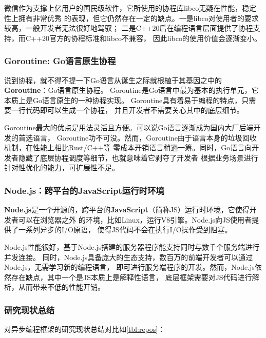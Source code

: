 \documentclass[supercite]{HustGraduPaper}
\newcommand{\rtbl}[1]{\autoref{tbl:#1}}
\theoremstyle{definition}
\begin{document}
微信\cite{montag2018multipurpose}作为支撑上亿用户的国民级软件，它所使用的协程库libco无疑在性能，稳定性上拥有非常优秀
的表现，但它仍然存在一定的缺点。一是libco对使用者的要求较高，一般开发者无法很好地驾驭；
二是C++20后在编程语言层面提供了协程支持\cite{belson2020c++}，而C++20官方的协程标准和libco不兼容，
因此libco的使用价值会逐渐变小。\par

\subsubsection{Goroutine: Go语言原生协程}
说到协程，就不得不提一下Go语言\cite{meyerson2014go}从诞生之际就根植于其基因之中的\textbf{Goroutine}：Go语言原生协程\cite{prabhakar2011concurrent}。
Goroutine是Go语言中最为基本的执行单元，它本质上是Go语言原生的一种协程实现。
Goroutine具有着易于编程的特点，只需要一行代码即可以生成一个协程，
并且开发者不需要关心其中的底层细节。\par

Goroutine最大的优点是用法灵活且方便。可以说Go语言逐渐成为国内大厂后端开发的首选语言，
Goroutine功不可没。然而，Goroutine由于语言本身的垃圾回收机制\cite{sareen2021much}，在性能上相比Rust/C++等
零成本开销语言稍逊一筹\cite{keskiniemi2022measuring}。同时，Go语言向开发者隐藏了底层协程调度等细节，也就意味着它剥夺了开发者
根据业务场景进行针对性优化的能力，可扩展性不足。\par

\subsubsection{Node.js：跨平台的JavaScript运行时环境}
\textbf{Node.js}\cite{tilkov2010node}是一个开源的，跨平台的\textbf{JavaScript}\cite{crockford2008javascript}（简称JS）运行时环境，它使得开发者可以在浏览器之外
的环境，比如Linux，运行V8引擎\cite{kumar2021design}。Node.js向JS使用者提供了一系列异步的I/O原语，
使得JS代码不会在执行I/O操作受到阻塞。\par

Node.js性能很好，基于Node.js搭建的服务器程序能支持同时与数千个服务端进行并发连接。
同时，Node.js具备庞大的生态支持，数百万的前端开发者可以通过Node.js，无需学习新的编程语言，
即可进行服务端程序的开发。然而，Node.js依然存在缺点，其中一个是JS本质上是解释性语言，
底层框架需要对JS代码进行解析，从而带来不低的性能开销。\par

\subsubsection{研究现状总结}
对异步编程框架的研究现状总结对比如\rtbl{repos}：
\end{document}
